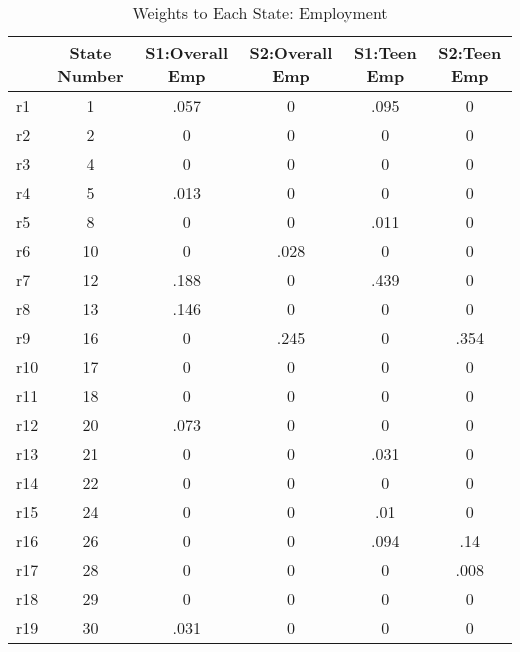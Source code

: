\begin{table}[htbp]\centering
\caption{Weights to Each State: Employment}
\begin{tabular}{l*{5}{c}}
\toprule
            &State Number&S1:Overall Emp&S2:Overall Emp& S1:Teen Emp& S2:Teen Emp\\
\midrule
r1          &           1&        .057&           0&        .095&           0\\
r2          &           2&           0&           0&           0&           0\\
r3          &           4&           0&           0&           0&           0\\
r4          &           5&        .013&           0&           0&           0\\
r5          &           8&           0&           0&        .011&           0\\
r6          &          10&           0&        .028&           0&           0\\
r7          &          12&        .188&           0&        .439&           0\\
r8          &          13&        .146&           0&           0&           0\\
r9          &          16&           0&        .245&           0&        .354\\
r10         &          17&           0&           0&           0&           0\\
r11         &          18&           0&           0&           0&           0\\
r12         &          20&        .073&           0&           0&           0\\
r13         &          21&           0&           0&        .031&           0\\
r14         &          22&           0&           0&           0&           0\\
r15         &          24&           0&           0&         .01&           0\\
r16         &          26&           0&           0&        .094&         .14\\
r17         &          28&           0&           0&           0&        .008\\
r18         &          29&           0&           0&           0&           0\\
r19         &          30&        .031&           0&           0&           0\\

\end{tabular}
\end{table}
